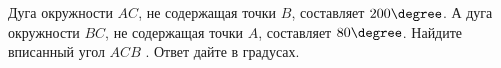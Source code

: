 \begin{ex}
	\begin{condition}
		Дуга окружности \( AC \), не содержащая точки \( B \), составляет \( 200\degree \). А дуга окружности \( BC \), не содержащая точки \( A \), составляет \( 80\degree \). Найдите вписанный угол \( ACB \) . Ответ дайте в градусах.
	\end{condition}
\end{ex}